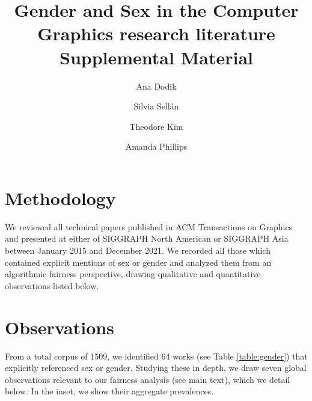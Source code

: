 \documentclass[nonacm,sigconf,review,balance=false]{acmart}
\begin{document}
\title{Gender and Sex in the Computer Graphics research literature \\
\Large{Supplemental Material}}

\author{Ana Dodik}

\author{Silvia Sellán}\authornotemark[1]


\author{Theodore Kim}

\author{Amanda Phillips}



\maketitle

\section{Methodology}

We reviewed all technical papers published in ACM Transactions on Graphics and
presented at either of SIGGRAPH North American or SIGGRAPH Asia between
January 2015 and December 2021. We recorded all those which contained
explicit mentions of sex or gender and analyzed them from an algorithmic fairness perspective, drawing qualitative and quantitative observations listed below.

\section{Observations}

From a total corpus of 1509, we identified 64 works (see Table \ref{table:gender}) that explicitly referenced sex or gender. Studying these in depth, we draw seven global observations relevant to our fairness analysis (see main text), which we detail below. In the inset, we show their aggregate prevalences. 
\end{document}
